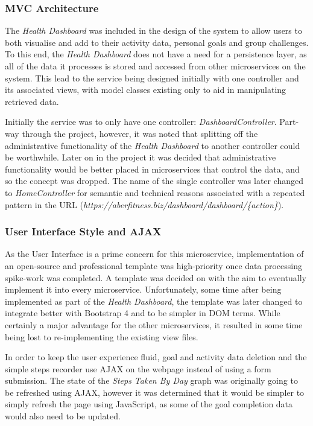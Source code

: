 \subsubsection{MVC Architecture}
\par
The \textit{Health Dashboard} was included in the design of the system to allow users to both visualise and add to their activity data, personal goals and group challenges. To this end, the \textit{Health Dashboard} does not have a need for a persistence layer, as all of the data it processes is stored and accessed from other microservices on the system. This lead to the service being designed initially with one controller and its associated views, with model classes existing only to aid in manipulating retrieved data.

\par
Initially the service was to only have one controller: \textit{DashboardController}. Part-way through the project, however, it was noted that splitting off the administrative functionality of the \textit{Health Dashboard} to another controller could be worthwhile. Later on in the project it was decided that administrative functionality would be better placed in microservices that control the data, and so the concept was dropped. The name of the single controller was later changed to \textit{HomeController} for semantic and technical reasons associated with a repeated pattern in the URL (\textit{https://aberfitness.biz/dashboard/dashboard/\{action\}}).

\subsubsection{User Interface Style and AJAX}
\par
As the User Interface is a prime concern for this microservice, implementation of an open-source and professional template was high-priority once data processing spike-work was completed. A template was decided on with the aim to eventually implement it into every microservice. Unfortunately, some time after being implemented as part of the \textit{Health Dashboard}, the template was later changed to integrate better with Bootstrap 4 and to be simpler in DOM terms. While certainly a major advantage for the other microservices, it resulted in some time being lost to re-implementing the existing view files.

\par
In order to keep the user experience fluid, goal and activity data deletion and the simple steps recorder use AJAX on the webpage instead of using a form submission. The state of the \textit{Steps Taken By Day} graph was originally going to be refreshed using AJAX, however it was determined that it would be simpler to simply refresh the page using JavaScript, as some of the goal completion data would also need to be updated.

